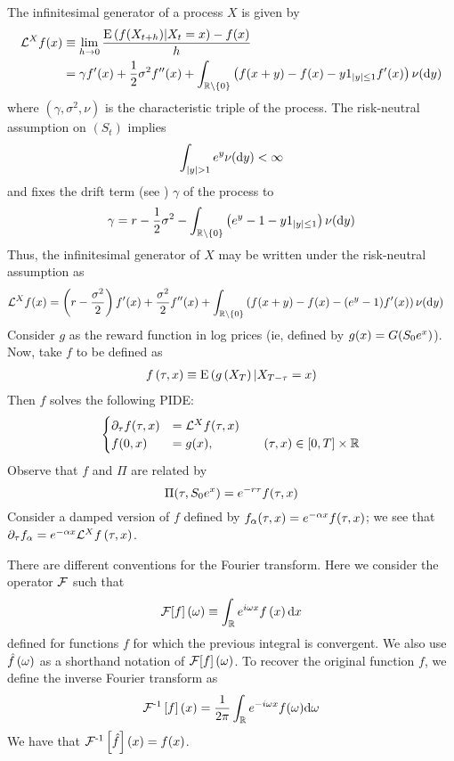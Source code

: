 \documentclass[11pt]{amsart}
\begin{document}
The infinitesimal generator of a \levy
process $X$ is given by \citep[see][]{applebaum2004levy}
\begin{align}
\mathcal{L}^{X} f(x)&\equiv 
\lim_{h\to 0} \frac{\mathrm{E} \left( {{f(X_{t+h})|X_t=x}} \right)-f(x)}h \notag \\
&= \gamma f'(x)+\frac12\sigma^2f''(x)+\int_{\mathbb{R} \setminus \left\lbrace {0} \right\rbrace} \left(f(x+y)-f(x)-y1_{|y|\leq 1} f'(x)\right)\nu(\textrm{d} y)
\end{align}
where $(\gamma,\sigma^2,\nu)$ is the characteristic triple of the \levy process.
The risk-neutral assumption on $(S_t)$ implies
\begin{equation} \label{eq:riskneutralexpint}
\int_{\absval{y}>1}\expfs{y} \nu(\d y)<\infty
\end{equation}
and fixes the drift term (see \cite{kiessling2011diffusion}) $\gamma$ of the \levy process to
\begin{align} 
\label{drift_equation}
\gamma = r-\frac12 \sigma^2 - \int_{\mathbb{R} \setminus \left\lbrace {0} \right\rbrace} \left( {e^{y}-1-y1_{|y|\leq 1} } \right)\nu(\textrm{d} y)
\end{align}
Thus, the infinitesimal generator of $X$ may be written under the risk-neutral assumption as
\begin{align}
\mathcal{L}^{X} f(x)&= \left(r-\frac{\sigma^2}2\right) f'(x)+\frac{\sigma^2}2 f''(x)+\int_{\mathbb{R} \setminus \left\lbrace {0} \right\rbrace} \left(f(x+y)-f(x)-(e^{y}-1)f'(x)\right)\nu(\textrm{d} y)
\end{align}
Consider $g$ as the reward function in log prices (ie, defined by 
$g(x)=G(S_0 e^{x})$). Now, take $f$ to be defined as
\begin{align*}
f \left( {\tau,x} \right) \equiv \mathrm{E} \left( {{g \left( {X_{T}} \right)|X_{T-\tau}=x}} \right)
\end{align*}
Then $f$ solves the following PIDE:
\begin{equation*}
\begin{cases}
\partial_{\tau}f(\tau,x)&=\mathcal{L}^{X} f(\tau,x) \\
f(0,x)&=g(x), \qquad \qquad \left( {\tau,x} \right)  \in [0,T] \times \mathbb{R}
\end{cases}
\end{equation*}
Observe that $f$ and $\Pi$ are related by
\begin{equation}
\Pi(\tau,S_0 e^{x})=e^{-r \tau}f(\tau,x)
\end{equation}
Consider a damped version of $f$ defined by $f_{\alpha}(\tau,x)=e^{-\alpha x}f(\tau,x)$; we see that $\partial_{\tau} f_{\alpha} = e^{-\alpha x} \mathcal{L}^{X} f\left( {\tau,x} \right) $.

There are different conventions for the Fourier transform. Here we consider the operator $\operatorname{\mathcal{F}}$ such that 
\begin{align}
\operatorname{\mathcal{F}}[f] \left( {\omega} \right) \equiv \int_{\mathbb{R}}e^{i\omega x} f \left( {x} \right) \textrm{d} x
\label{eq:fourierDefinition}
\end{align}
defined for functions $f$ for which the previous integral is convergent. We also use $\hat{f} \left( {\omega} \right)$ as a shorthand notation of $\operatorname{\mathcal{F}}[f]\left( {\omega} \right)$.
To recover the original function $f$, we define the inverse Fourier transform as 
$$\operatorname{\mathcal{F}^{-1}}\left[f\right](x)=\frac{1}{2\pi}\int_{\mathbb{R}} e^{-i\omega x}f(\omega) \textrm{d} \omega$$
We have that $\operatorname{\mathcal{F}^{-1}}\left[\hat{f}\right](x)=f(x)$.
\end{document}
